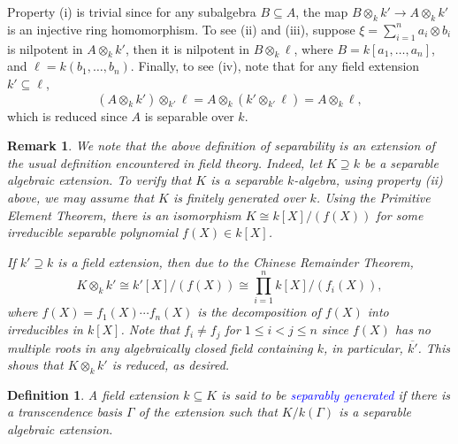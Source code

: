 \documentclass[10pt]{article}
\theoremstyle{thmstyle}
\theoremstyle{defstyle}
\newtheorem{definition}[theorem]{Definition}
\newtheorem{remark}[theorem]{Remark}
\newcommand{\define}[1]{\textcolor{blue}{\textit{#1}}}
\renewcommand{\le}{\leqslant}
\begin{document}
Property (i) is trivial since for any subalgebra $B\subseteq A$, the map $B\otimes_k k'\to A\otimes_k k'$ is an injective ring homomorphism. To see (ii) and (iii), suppose $\xi = \sum_{i = 1}^n a_i\otimes b_i$ is nilpotent in $A\otimes_k k'$, then it is nilpotent in $B\otimes_k \ell$, where $B = k[a_1,\dots, a_n]$, and $\ell = k(b_1,\dots, b_n)$. Finally, to see (iv), note that for any field extension $k'\subseteq\ell$, 
\begin{equation*}
    \left(A\otimes_k k'\right)\otimes_{k'}\ell =  A\otimes_k\left(k'\otimes_{k'}\ell\right) = A\otimes_k \ell,
\end{equation*}
which is reduced since $A$ is separable over $k$.

\begin{remark}
    We note that the above definition of separability is an extension of the usual definition encountered in field theory. Indeed, let $K\supseteq k$ be a separable algebraic extension. To verify that $K$ is a separable $k$-algebra, using property (ii) above, we may assume that $K$ is finitely generated over $k$. Using the Primitive Element Theorem, there is an isomorphism $K\cong k[X]/(f(X))$ for some irreducible separable polynomial $f(X)\in k[X]$. 

    If $k'\supseteq k$ is a field extension, then due to the Chinese Remainder Theorem,
    \begin{equation*}
        K\otimes_k k'\cong k'[X]/(f(X))\cong\prod_{i = 1}^n k[X]/(f_i(X)),
    \end{equation*}
    where $f(X) = f_1(X)\cdots f_n(X)$ is the decomposition of $f(X)$ into irreducibles in $k[X]$. Note that $f_i\ne f_j$ for $1\le i < j\le n$ since $f(X)$ has no multiple roots in any algebraically closed field containing $k$, in particular, $\overline{k'}$. This shows that $K\otimes_k k'$ is reduced, as desired.
\end{remark}

\begin{definition}
    A field extension $k\subseteq K$ is said to be \define{separably generated} if there is a transcendence basis $\Gamma$ of the extension such that $K/k(\Gamma)$ is a separable algebraic extension.
\end{definition}
\end{document}
